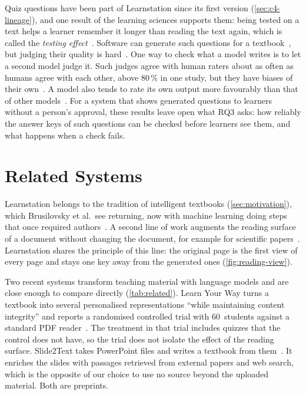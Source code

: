 Quiz questions have been part of Learnstation since its first version
(\cref{sec:c4-lineage}), and one result of the learning sciences supports
them: being tested on a text helps a learner remember it longer than reading
the text again, which is called the \emph{testing
effect}~\cite{roediger2006testing}. Software can generate such questions for
a textbook~\cite{vancampenhout2021transforming}, but judging their quality is
hard~\cite{kurdi2020aqg}. One way to check what a model writes is to let a
second model judge it. Such judges agree with human raters about as often as
humans agree with each other, above 80\,\% in one study, but they have biases
of their own~\cite{zheng2023judging}. A model also tends to rate its own
output more favourably than that of other
models~\cite{panickssery2024selfpreference}. For a system that shows
generated questions to learners without a person's approval, these results
leave open what RQ3 asks: how reliably the answer keys of such questions can
be checked before learners see them, and what happens when a check fails.

\section{Related Systems}
\label{sec:positioning}

Learnstation belongs to the tradition of intelligent textbooks
(\cref{sec:motivation}), which Brusilovsky et al.\ see returning, now with
machine learning doing steps that once required
authors~\cite{brusilovsky2022return}. A second line of work augments the
reading surface of a document without changing the document, for example for
scientific papers~\cite{lo2024semanticreader}. Learnstation shares the
principle of this line: the original page is the first view of every page and
stays one key away from the generated ones (\cref{fig:reading-view}).

Two recent systems transform teaching material with language models and are
close enough to compare directly (\cref{tab:related}). Learn Your Way turns a
textbook into several personalised representations ``while maintaining
content integrity'' and reports a randomised controlled trial with
60~students against a standard PDF reader~\cite{learnlm2025textbook}. The
treatment in that trial includes quizzes that the control does not have, so
the trial does not isolate the effect of the reading surface. Slide2Text takes
PowerPoint files and writes a textbook from them~\cite{zhou2025slide2text}. It
enriches the slides with passages retrieved from external papers and web
search, which is the opposite of our choice to use no source beyond the
uploaded material. Both are preprints.

